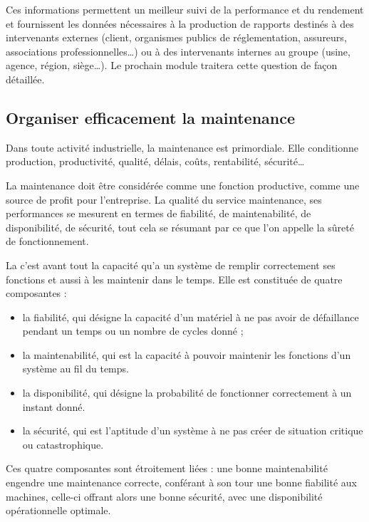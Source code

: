 Ces informations permettent un meilleur suivi de la performance et du rendement et fournissent les données nécessaires à la production de rapports destinés à des intervenants externes (client, organismes publics de réglementation, assureurs, associations professionnelles…) ou à des intervenants internes au groupe (usine, agence, région, siège…). Le prochain module traitera cette question de façon détaillée.


\subsection{	Organiser efficacement la maintenance}

Dans toute activité industrielle, la maintenance est primordiale. Elle conditionne production, productivité, qualité, délais, coûts, rentabilité, sécurité…
\vspace{0.3cm} 

La maintenance doit être considérée comme une fonction productive, comme une source de profit pour l’entreprise. La qualité du service maintenance, ses performances se mesurent en termes de fiabilité, de maintenabilité, de disponibilité, de sécurité, tout cela se résumant par ce que l’on appelle la sûreté de fonctionnement.
\vspace{0.3cm} 

La  c’est avant tout la capacité qu’a un système de remplir correctement ses fonctions et aussi à les maintenir dans le temps. Elle est constituée de quatre composantes :

\begin{itemize}
\item la fiabilité, qui désigne la capacité d’un matériel à ne pas avoir de défaillance pendant un temps ou un nombre de cycles donné ;
\item la maintenabilité, qui est la capacité à pouvoir maintenir les fonctions d’un système au fil du temps.
\item la disponibilité, qui désigne la probabilité de fonctionner correctement à un instant donné.
\item la sécurité, qui est l’aptitude d’un système à ne pas créer de situation critique ou catastrophique.
\end{itemize}

\vspace{0.3cm}

Ces quatre composantes sont étroitement liées : une bonne maintenabilité engendre une maintenance correcte, conférant à son tour une bonne fiabilité aux machines, celle-ci offrant alors une bonne sécurité, avec une disponibilité opérationnelle optimale.

